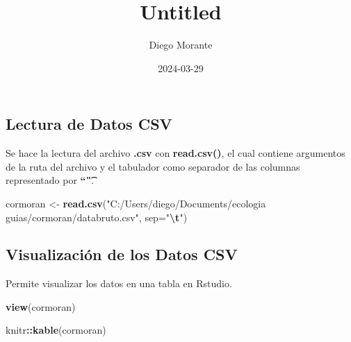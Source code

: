 \documentclass[
]{article}
\title{Untitled}
\author{Diego Morante}
\date{2024-03-29}
\newenvironment{Shaded}{\begin{snugshade}}{\end{snugshade}}
\newcommand{\AttributeTok}[1]{\textcolor[rgb]{0.13,0.29,0.53}{#1}}
\newcommand{\FunctionTok}[1]{\textcolor[rgb]{0.13,0.29,0.53}{\textbf{#1}}}
\newcommand{\NormalTok}[1]{#1}
\newcommand{\OtherTok}[1]{\textcolor[rgb]{0.56,0.35,0.01}{#1}}
\newcommand{\SpecialCharTok}[1]{\textcolor[rgb]{0.81,0.36,0.00}{\textbf{#1}}}
\newcommand{\StringTok}[1]{\textcolor[rgb]{0.31,0.60,0.02}{#1}}
\begin{document}
\maketitle

\hypertarget{lectura-de-datos-csv}{%
\subsection{Lectura de Datos CSV}\label{lectura-de-datos-csv}}

Se hace la lectura del archivo \textbf{.csv} con \textbf{read.csv()}, el
cual contiene argumentos de la ruta del archivo y el tabulador como
separador de las columnas representado por \textbf{``\t"}.

\begin{Shaded}
\begin{Highlighting}[]
\NormalTok{cormoran }\OtherTok{\textless{}{-}} \FunctionTok{read.csv}\NormalTok{(}\StringTok{"C:/Users/diego/Documents/ecologia guias/cormoran/databruto.csv"}\NormalTok{, }\AttributeTok{sep=}\StringTok{"}\SpecialCharTok{\textbackslash{}t}\StringTok{"}\NormalTok{)}
\end{Highlighting}
\end{Shaded}

\hypertarget{visualizaciuxf3n-de-los-datos-csv}{%
\subsection{Visualización de los Datos
CSV}\label{visualizaciuxf3n-de-los-datos-csv}}

Permite visualizar los datos en una tabla en Rstudio.

\begin{Shaded}
\begin{Highlighting}[]
\FunctionTok{view}\NormalTok{(cormoran)}
\end{Highlighting}
\end{Shaded}

\begin{Shaded}
\begin{Highlighting}[]
\NormalTok{knitr}\SpecialCharTok{::}\FunctionTok{kable}\NormalTok{(cormoran)}
\end{Highlighting}
\end{Shaded}
\end{document}
